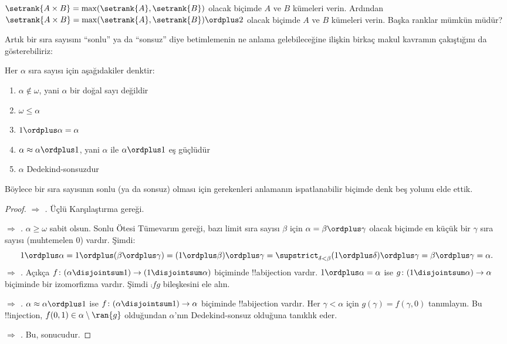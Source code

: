 \documentclass[../../../include/open-logic-section]{subfiles}
\begin{document}
\begin{prob}
$\setrank{A\times B}=\max(\setrank{A},\setrank{B})$ olacak biçimde $A$ ve
$B$ kümeleri verin. Ardından
$\setrank{A\times B}=\max(\setrank{A},\setrank{B})\ordplus 2$ olacak
biçimde $A$ ve $B$ kümeleri verin. Başka ranklar mümkün müdür?
\end{prob}

Artık bir sıra sayısını ``sonlu'' ya da ``sonsuz'' diye betimlemenin ne
anlama gelebileceğine ilişkin birkaç makul kavramın çakıştığını da
gösterebiliriz:

\begin{lem}
Her $\alpha$ sıra sayısı için aşağıdakiler denktir:
\begin{enumerate}
	\item{} $\alpha\notin\omega$, yani $\alpha$ bir
	doğal sayı değildir
	\item{} $\omega\leq\alpha$
	\item{} $1\ordplus\alpha=\alpha$
	\item{} $\alpha\approx\alpha\ordplus 1$, yani
	$\alpha$ ile $\alpha\ordplus 1$ eş güçlüdür
	\item{} $\alpha$ Dedekind-sonsuzdur
	\end{enumerate}
\end{lem}
\noindent
Böylece bir sıra sayısının sonlu (ya da sonsuz) olması için gerekenleri
anlamanın ispatlanabilir biçimde denk beş yolunu elde ettik.

\begin{proof}
\emph{ $\Rightarrow$ .}
Üçlü Karşılaştırma gereği.

\emph{ $\Rightarrow$ .}
$\alpha\geq\omega$ sabit olsun. Sonlu Ötesi Tümevarım gereği, bazı limit
sıra sayısı $\beta$ için $\alpha=\beta\ordplus\gamma$ olacak biçimde en
küçük bir $\gamma$ sıra sayısı (muhtemelen $0$) vardır. Şimdi:
\[
	1 \ordplus \alpha =  
	1 \ordplus (\beta \ordplus \gamma) = 
	(1 \ordplus \beta) \ordplus \gamma =  
	\supstrict_{\delta < \beta} (1 \ordplus  \delta) \ordplus  \gamma = 
	\beta \ordplus  \gamma = 
	\alpha.
\]
\emph{ $\Rightarrow$ .}
Açıkça $f\colon(\alpha\disjointsum 1)\to(1\disjointsum\alpha)$ biçiminde
!!a{bijection} vardır. $1\ordplus\alpha=\alpha$ ise
$g\colon(1\disjointsum\alpha)\to\alpha$ biçiminde bir izomorfizma vardır.
Şimdi $\comp{f}{g}$ bileşkesini ele alın.

\emph{ $\Rightarrow$ .}
$\alpha\approx\alpha\ordplus 1$ ise
$f\colon(\alpha\disjointsum 1)\to\alpha$ biçiminde !!a{bijection} vardır.
Her $\gamma<\alpha$ için $g(\gamma)=f(\gamma,0)$ tanımlayın. Bu
!!{injection}, $f(0,1)\in\alpha\setminus\ran{g}$ olduğundan $\alpha$'nın
Dedekind-sonsuz olduğuna tanıklık eder.

\emph{ $\Rightarrow$ .}
Bu,  sonucudur.
\end{proof}
\end{document}

